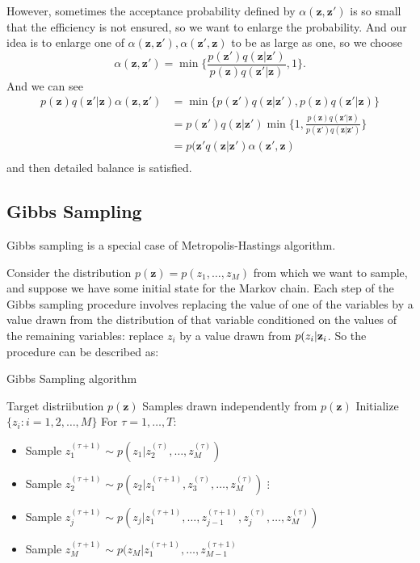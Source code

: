 \documentclass[a4paper]{book}
\newcommand{\mbf}{\mathbf}
\newcommand{\zz}{\mbf z}
\begin{document}
However, sometimes the acceptance probability defined by $\alpha(\zz,\zz')$ is so small that the efficiency is not ensured, so we want to enlarge the probability. And our idea is to enlarge one of $\alpha(\zz,\zz'), \alpha(\zz',\zz)$ to be as large as one, so we choose
\begin{equation}\label{}
  \alpha(\zz,\zz')=\min\{\frac{p(\zz')q(\zz|\zz')}{p(\zz)q(\zz'|\zz)}, 1\}.
\end{equation}
And we can see
\begin{equation}\label{}
\begin{aligned}
  p(\zz)q(\zz'|\zz)\alpha(\zz,\zz') &= \min\{p(\zz')q(\zz|\zz'), p(\zz)q(\zz'|\zz)\} \\
  & = p(\zz')q(\zz|\zz')\min\{1, \frac{p(\zz)q(\zz'|\zz)}{p(\zz')q(\zz|\zz')}\} \\
  & = p(\zz'q(\zz|\zz')\alpha(\zz',\zz) \\
\end{aligned}
\end{equation}
and then detailed balance is satisfied.

\subsection{Gibbs Sampling}
Gibbs sampling is a special case of Metropolis-Hastings algorithm.

Consider the distribution $p(\zz) = p(z_1,\dots, z_M)$ from which we want to sample, and suppose we have some initial state for the Markov chain. Each step of the Gibbs sampling procedure involves replacing the value of one of the variables by a value drawn from the distribution of that variable conditioned on the values of the remaining variables: replace $z_i$ by a value drawn from $p(z_i|\zz_{\\i}$. So the procedure can be described as:
\begin{algorithm}
\caption{Gibbs Sampling algorithm}
\begin{algorithmic}
\Require Target distriibution $p(\zz)$
\Ensure Samples drawn independently from $p(\zz)$
\State Initialize $\{z_i: i=1, 2, \dots, M\}$
\State For $\tau=1, \dots, T$:
\begin{itemize}
  \item Sample $z_1^{(\tau+1)}\sim p(z_1|z_2^{(\tau)}, \dots, z_M^{(\tau)})$
  \item Sample $z_2^{(\tau+1)}\sim p(z_2|z_1^{(\tau+1)}, z_3^{(\tau)}, \dots, z_M^{(\tau)})$
  \newline $\vdots$
  \item Sample $z_j^{(\tau+1)}\sim p(z_j|z_1^{(\tau+1)},\dots, z_{j-1}^{(\tau+1)},z_j^{(\tau)}, \dots,z_M^{(\tau)})$
  \item Sample $z_M^{(\tau+1)}\sim p(z_M|z_1^{(\tau+1)},\dots, z_{M-1}^{(\tau+1)}$
\end{itemize}
\end{algorithmic}
\end{algorithm}
\end{document}
